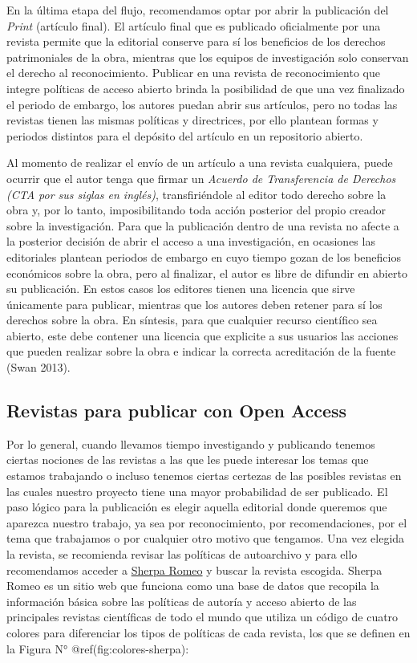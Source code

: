 \documentclass[
  spanish,
  letterpaper,
  DIV=11,
  numbers=noendperiod]{scrreprt}
\begin{document}
En la última etapa del flujo, recomendamos optar por abrir la
publicación del \emph{Print} (artículo final). El artículo final que es
publicado oficialmente por una revista permite que la editorial conserve
para sí los beneficios de los derechos patrimoniales de la obra,
mientras que los equipos de investigación solo conservan el derecho al
reconocimiento. Publicar en una revista de reconocimiento que integre
políticas de acceso abierto brinda la posibilidad de que una vez
finalizado el periodo de embargo, los autores puedan abrir sus
artículos, pero no todas las revistas tienen las mismas políticas y
directrices, por ello plantean formas y periodos distintos para el
depósito del artículo en un repositorio abierto.

Al momento de realizar el envío de un artículo a una revista cualquiera,
puede ocurrir que el autor tenga que firmar un \emph{Acuerdo de
Transferencia de Derechos (CTA por sus siglas en inglés)},
transfiriéndole al editor todo derecho sobre la obra y, por lo tanto,
imposibilitando toda acción posterior del propio creador sobre la
investigación. Para que la publicación dentro de una revista no afecte a
la posterior decisión de abrir el acceso a una investigación, en
ocasiones las editoriales plantean periodos de embargo en cuyo tiempo
gozan de los beneficios económicos sobre la obra, pero al finalizar, el
autor es libre de difundir en abierto su publicación. En estos casos los
editores tienen una licencia que sirve únicamente para publicar,
mientras que los autores deben retener para sí los derechos sobre la
obra. En síntesis, para que cualquier recurso científico sea abierto,
este debe contener una licencia que explicite a sus usuarios las
acciones que pueden realizar sobre la obra e indicar la correcta
acreditación de la fuente (Swan 2013).

\subsection{Revistas para publicar con Open
Access}\label{revistas-para-publicar-con-open-access}

Por lo general, cuando llevamos tiempo investigando y publicando tenemos
ciertas nociones de las revistas a las que les puede interesar los temas
que estamos trabajando o incluso tenemos ciertas certezas de las
posibles revistas en las cuales nuestro proyecto tiene una mayor
probabilidad de ser publicado. El paso lógico para la publicación es
elegir aquella editorial donde queremos que aparezca nuestro trabajo, ya
sea por reconocimiento, por recomendaciones, por el tema que trabajamos
o por cualquier otro motivo que tengamos. Una vez elegida la revista, se
recomienda revisar las políticas de autoarchivo y para ello recomendamos
acceder a \href{https://v2.sherpa.ac.uk/romeo/}{Sherpa Romeo} y buscar
la revista escogida. Sherpa Romeo es un sitio web que funciona como una
base de datos que recopila la información básica sobre las políticas de
autoría y acceso abierto de las principales revistas científicas de todo
el mundo que utiliza un código de cuatro colores para diferenciar los
tipos de políticas de cada revista, los que se definen en la Figura N°
@ref(fig:colores-sherpa):
\end{document}
